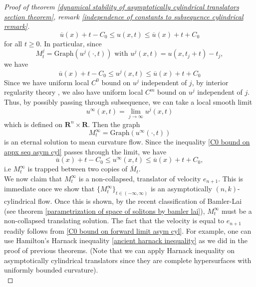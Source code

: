 \documentclass[pdflatex,sn-mathphys-num]{sn-jnl}%
\begin{document}
\begin{proof}[Proof of theorem \ref{dynamical stability of asymptotically cylindrical translators section theorem}, remark \ref{independence of constants to subsequence cylindrical remark}]
\begin{equation}
    \overline{u}(x) + t - C_0 \leq u(x,t) \leq \overline{u}(x) +t+ C_0
\end{equation}
for all $t \geq 0$. In particular, since
\begin{equation}
    M^j_t = \text{Graph}(u^j(\cdot, t)) \text{ with }u^j(x,t) = u(x, t_j + t) - t_j,
\end{equation}
we have
\begin{equation}\label{C0 bound on appx seq asym cyl}
    \overline{u}(x) + t - C_0 \leq u^j(x,t) \leq \overline{u}(x) +t+ C_0
\end{equation}
Since we have uniform local $C^0$ bound on $u^j$ independent of $j$, by interior regularity theory \cite{Ecker1991InteriorEF}, we also have uniform local $C^m$ bound on $u^j$ independent of $j$. Thus, by possibly passing through subsequence, we can take a local smooth limit
\begin{equation}
    u^{\infty}(x,t) = \lim_{j \to \infty}u^j(x,t)
\end{equation}
which is defined on $\mathbf{R}^n \times \mathbf{R}$. Then the graph
\begin{equation}
    M^{\infty}_t = \text{Graph}(u^{\infty}(\cdot, t))
\end{equation}
is an eternal solution to mean curvature flow. Since the inequality \eqref{C0 bound on appx seq asym cyl} passes through the limit, we have
\begin{equation}\label{C0 bound on forward limit asym cyl} 
    \overline{u}(x) + t - C_0 \leq u^{\infty}(x,t) \leq \overline{u}(x) + t + C_0,
\end{equation}
i.e $M^{\infty}_t$ is trapped between two copies of $\overline{M}_t$.\\

We now claim that $M^{\infty}_t$ is a non-collapsed, translator of velocity $e_{n+1}$. This is immediate once we show that $
\{M^{\infty}_t\}_{t \in (-\infty, \infty)}$ is an asymptotically $(n,k)$-cylindrical flow. Once this is shown, by the recent classification of Bamler-Lai \cite{Bamler2025-thclassification} (see theorem \ref{parametrization of space of solitons by bamler lai}), $M^{\infty}_t$  must be a non-collapsed translating solution. The fact that the velocity is equal to $e_{n+1}$ readily follows from \eqref{C0 bound on forward limit asym cyl}. For example, one can use Hamilton's Harnack inequality \eqref{ancient harnack inequality} as we did in the proof of previous theorems. (Note that we can apply Harnack inequality on asymptotically cylindrical translators since they are complete hypersurfaces with uniformly bounded curvature). \\


\end{proof}
\end{document}
